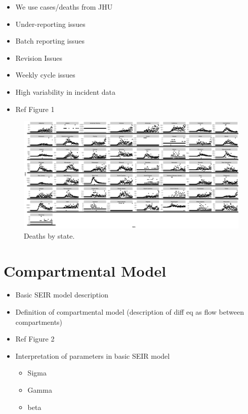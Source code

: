 \documentclass[11pt]{amsart}
\begin{document}
\begin{itemize}
\item We use cases/deaths from JHU
\item Under-reporting issues
\item Batch reporting issues
\item Revision Issues
\item Weekly cycle issues
\item High variability in incident data
\item Ref Figure 1
\end{itemize}





 \begin{figure}
     \centering
     \includegraphics[scale=.1]{data_plot.png}
     \caption{Deaths by state. }
     \label{fig:my_label}
 \end{figure}
 
 \section{Compartmental Model}
 \begin{itemize}
 \item Basic SEIR model description
 \item Definition of compartmental model (description of diff eq as flow between compartments)
 \item Ref Figure 2
 \item Interpretation of parameters in basic SEIR model 
 \begin{itemize}
 \item Sigma
 \item Gamma
 \item beta
 \end{itemize}
 
 \end{itemize}
 
\end{document}
